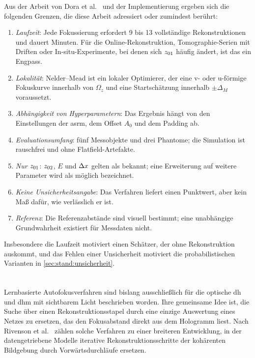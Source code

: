 Aus der Arbeit von Dora et al.\ \cite{dora2025autofocus} und der
Implementierung ergeben sich die folgenden Grenzen, die diese Arbeit adressiert oder zumindest berührt:
\begin{enumerate}
  \item \emph{Laufzeit}: Jede Fokussierung erfordert 9 bis 13 vollständige
    Rekonstruktionen und dauert Minuten. Für die Online-Rekonstruktion,
    Tomographie-Serien mit Driften oder In-situ-Experimente, bei denen sich
    $z_{01}$ häufig ändert, ist das ein Engpass.
  \item \emph{Lokalität}: Nelder--Mead ist ein lokaler Optimierer, der eine
    v- oder u-förmige Fokuskurve innerhalb von $\Omega_z$ und eine
    Startschätzung innerhalb $\pm\Delta_M$ voraussetzt.
  \item \emph{Abhängigkeit von Hyperparametern}: Das Ergebnis hängt von den
    Einstellungen der \ac{asrm}, dem Offset $A_0$ und dem Padding ab.
  \item \emph{Evaluationsumfang}: fünf Messobjekte und drei Phantome; die
    Simulation ist rauschfrei und ohne Flatfield-Artefakte.
  \item \emph{Nur $z_{01}$}: $z_{02}$, $E$ und $\Delta x$ gelten als bekannt; eine
    Erweiterung auf weitere Parameter wird als möglich bezeichnet.
  \item \emph{Keine Unsicherheitsangabe}: Das Verfahren liefert einen
    Punktwert, aber kein Maß dafür, wie verlässlich er ist.
  \item \emph{Referenz}: Die Referenzabstände sind visuell bestimmt; eine
    unabhängige Grundwahrheit existiert für Messdaten nicht.
\end{enumerate}
Insbesondere die Laufzeit motiviert einen Schätzer, der ohne Rekonstruktion
auskommt, und das Fehlen einer Unsicherheit motiviert die probabilistischen
Varianten in \cref{sec:stand:unsicherheit}.

\section{}
\label{sec:stand:dl-autofokus}

Lernbasierte Autofokusverfahren sind bislang ausschließlich für die optische
\ac{dh} und \ac{dhm} mit sichtbarem Licht beschrieben worden. Ihre
gemeinsame Idee ist, die Suche über einen Rekonstruktionsstapel durch eine
einzige Auswertung eines Netzes zu ersetzen, das den Fokusabstand direkt
aus dem Hologramm liest. Nach Rivenson et al.\ \cite{rivenson2019deep} zählen solche
Verfahren zu einer breiteren Entwicklung, in der datengetriebene Modelle
iterative Rekonstruktionsschritte der kohärenten Bildgebung durch
Vorwärtsdurchläufe ersetzen.

